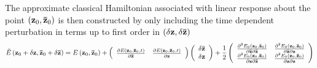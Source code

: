 \documentclass{amsart}
\begin{document}
The approximate classical Hamiltonian associated with linear response about
the point $\left( {{\rm {\bf z}}_0 ,{\rm {\bf \bar {z}}}_0 } \right)$ is
then constructed by only including the time dependent perturbation in terms
up to first order in $\left( {\delta {\rm {\bf z}},\delta {\rm {\bf \bar
{z}}}} \right)$\underline { }
\[
\tilde {E}\left( {{\rm {\bf z}}_0 +\delta {\rm {\bf z}},{\rm {\bf \bar
{z}}}_0 +\delta {\rm {\bf \bar {z}}}} \right)=E\left( {{\rm {\bf z}}_0 ,{\rm
{\bf \bar {z}}}_0 } \right)+\left( {{\begin{array}{*{20}c}
 {\frac{\partial E\left( {{\rm {\bf z}}_0 ,{\rm {\bf \bar {z}}}_0 ,t}
\right)}{\partial {\rm {\bf \bar {z}}}}} \hfill & {\frac{\partial E\left(
{{\rm {\bf z}}_0 ,{\rm {\bf \bar {z}}}_0 ,t} \right)}{\partial {\rm {\bf
z}}}} \hfill \\
\end{array} }} \right)\left( {{\begin{array}{*{20}c}
 {\delta {\rm {\bf \bar {z}}}} \hfill \\
 {\delta {\rm {\bf z}}} \hfill \\
\end{array} }} \right)+\frac{1}{2}\left( {{\begin{array}{*{20}c}
 {\frac{\partial ^2E_0 \left( {{\rm {\bf z}}_0 ,{\rm {\bf \bar {z}}}_0 }
\right)}{\partial {\rm {\bf \bar {z}}}\partial {\rm {\bf \bar {z}}}}} \hfill
& {\frac{\partial ^2E_0 \left( {{\rm {\bf z}}_0 ,{\rm {\bf \bar {z}}}_0 }
\right)}{\partial {\rm {\bf \bar {z}}}\partial {\rm {\bf z}}}} \hfill \\
 {\frac{\partial ^2E_0 \left( {{\rm {\bf z}}_0 ,{\rm {\bf \bar {z}}}_0 }
\right)}{\partial {\rm {\bf z}}\partial {\rm {\bf \bar {z}}}}} \hfill &
{\frac{\partial ^2E_0 \left( {{\rm {\bf z}}_0 ,{\rm {\bf \bar {z}}}_0 }
\right)}{\partial {\rm {\bf z}}\partial {\rm {\bf z}}}} \hfill \\
\end{array} }} \right)
\]
\end{document}
